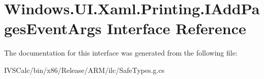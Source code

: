 \hypertarget{interface_windows_1_1_u_i_1_1_xaml_1_1_printing_1_1_i_add_pages_event_args}{}\section{Windows.\+U\+I.\+Xaml.\+Printing.\+I\+Add\+Pages\+Event\+Args Interface Reference}
\label{interface_windows_1_1_u_i_1_1_xaml_1_1_printing_1_1_i_add_pages_event_args}


The documentation for this interface was generated from the following file\+:\begin{DoxyCompactItemize}
\item 
I\+V\+S\+Calc/bin/x86/\+Release/\+A\+R\+M/ilc/Safe\+Types.\+g.\+cs\end{DoxyCompactItemize}
